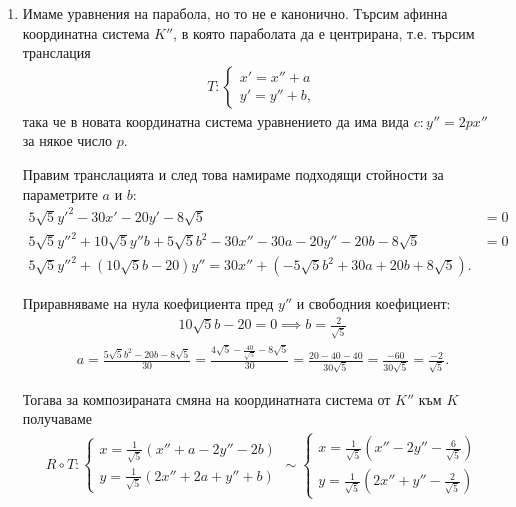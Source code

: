 \documentclass[numbers=endperiod, bibliography=totocnumbered]{scrartcl}
\begin{document}
\begin{solution}
\begin{enumerate}
    \item Имаме уравнения на парабола, но то не е канонично. Търсим афинна координатна система \( K'' \), в която параболата да е центрирана, т.е. търсим транслация
    \begin{align*}
      T: \begin{cases}
        x' = x'' + a \\
        y' = y'' + b,
      \end{cases}
    \end{align*}
    така че в новата координатна система уравнението да има вида \( c: y'' = 2px'' \) за някое число \( p \).

    Правим транслацията и след това намираме подходящи стойности за параметрите \( a \) и \( b \):
    \begin{align*}
      5 \sqrt 5 y'^2 - 30 x' - 20 y' - 8 \sqrt 5 &= 0 \\
      5 \sqrt 5 y''^2 + 10 \sqrt 5 y'' b + 5 \sqrt 5 b^2 - 30 x'' - 30a - 20 y'' - 20b - 8 \sqrt 5 &= 0 \\
      5 \sqrt 5 y''^2 + (10 \sqrt 5 b - 20) y'' = 30 x'' + (- 5 \sqrt 5 b^2 + 30a + 20b + 8 \sqrt 5).
    \end{align*}

    Приравняваме на нула коефициента пред \( y'' \) и свободния коефициент:
    \begin{align*}
      10 \sqrt 5 b - 20 = 0 \implies b = \frac 2 {\sqrt 5}
    \end{align*}
    \begin{align*}
      a
      =
      \frac {5 \sqrt 5 b^2 - 20 b - 8 \sqrt 5} {30}
      =
      \frac {4 \sqrt 5 - \frac {40} {\sqrt 5} - 8 \sqrt 5} {30}
      =
      \frac {20 - 40 - 40} {30 \sqrt 5}
      =
      \frac {-60} {30 \sqrt 5}
      =
      \frac {-2} {\sqrt 5}.
    \end{align*}

    Тогава за композираната смяна на координатната система от \( K'' \) към \( K \) получаваме
    \begin{align*}
      R \circ T: \begin{cases}
        x = \frac 1 {\sqrt 5} \left( x'' + a - 2y'' - 2b \right) \\
        y = \frac 1 {\sqrt 5} \left( 2x'' + 2a + y'' + b \right)
      \end{cases}
      \sim
      \begin{cases}
        x = \frac 1 {\sqrt 5} \left( x'' - 2y'' - \frac 6 {\sqrt 5} \right) \\
        y = \frac 1 {\sqrt 5} \left( 2x'' + y'' - \frac 2 {\sqrt 5} \right)
      \end{cases}
    \end{align*}


\end{enumerate}
\end{solution}
\end{document}
